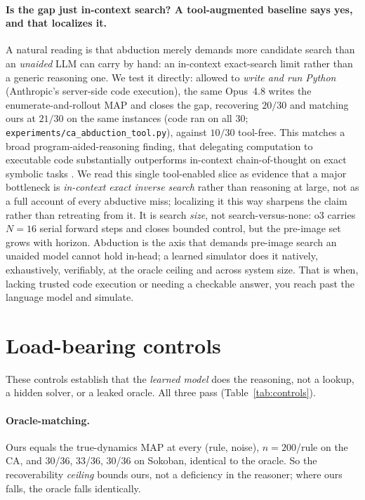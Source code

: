 \documentclass{article}
\begin{document}
\paragraph{Is the gap just in-context search? A tool-augmented baseline says yes, and that localizes it.}
A natural reading is that abduction merely demands more candidate search than an \emph{unaided} LLM can
carry by hand: an in-context exact-search limit rather than a generic reasoning one. We test it
directly: allowed to \emph{write and run Python} (Anthropic's server-side code execution), the same
Opus~4.8 writes the enumerate-and-rollout MAP and closes the gap, recovering $20/30$ and matching ours at $21/30$ on
the same instances (code ran on all $30$; \texttt{experiments/ca\_abduction\_tool.py}), against $10/30$
tool-free. This matches a broad program-aided-reasoning finding, that delegating computation to
executable code substantially outperforms in-context chain-of-thought on exact symbolic tasks
\cite{pal, pot}. We read this single tool-enabled slice as evidence that a major bottleneck is
\emph{in-context exact inverse search} rather than reasoning at large, not as a full account of every
abductive miss; localizing it this way sharpens the claim rather than retreating from it. It is search \emph{size}, not
search-versus-none: o3 carries $N{=}16$ serial forward steps and closes bounded control, but the
pre-image set grows with horizon. Abduction is the axis that demands pre-image search an unaided model
cannot hold in-head; a learned simulator does it natively, exhaustively, verifiably, at the oracle
ceiling and across system size. That is when, lacking trusted code execution or needing a checkable
answer, you reach past the language model and simulate.

\section{Load-bearing controls}
\label{sec:controls}

These controls establish that the \emph{learned model} does the reasoning, not a lookup, a hidden
solver, or a leaked oracle. All three pass (Table~\ref{tab:controls}).

\paragraph{Oracle-matching.}
Ours equals the true-dynamics MAP at every (rule, noise), $n=200$/rule on the CA, and 30/36, 33/36,
30/36 on Sokoban, identical to the oracle. So the recoverability \emph{ceiling} bounds ours, not a
deficiency in the reasoner; where ours falls, the oracle falls identically.
\end{document}
